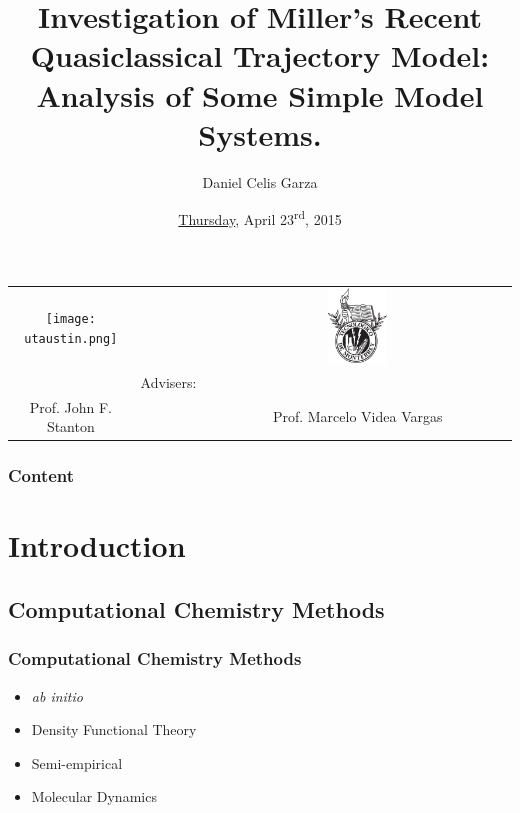 \documentclass[xetex,mathserif,serif]{beamer}
\title[]{Investigation of Miller's Recent Quasiclassical Trajectory Model: Analysis of Some Simple Model Systems.}
\author{Daniel Celis Garza}
\date{\href{http://i.imgur.com/0uDfMnJ.gif}{Thursday}, April 23\textsuperscript{rd}, 2015}
\begin{document}
{
\begin{frame}
\titlepage
\vspace*{-2cm}
\begin{center}
\begin{tabular}{ccc}
\texttt{[image: utaustin.png]}& &
\includegraphics[width=0.2\textwidth]{tec.eps}\\
& Advisers: &\\
Prof. John F. Stanton& & Prof. Marcelo Videa Vargas
\end{tabular}
\end{center}
\end{frame}
{
\begin{frame}
\frametitle{Content} %
\begin{multicols}{2}
\tableofcontents
\end{multicols}
\end{frame}
}
}

\section{Introduction}
\subsection{Computational Chemistry Methods}
\begin{frame}
\frametitle{Computational Chemistry Methods}
\begin{itemize}
\item \emph{ab initio}
\item Density Functional Theory
\item Semi-empirical
\item Molecular Dynamics
\end{itemize}
\end{frame}
\end{document}
